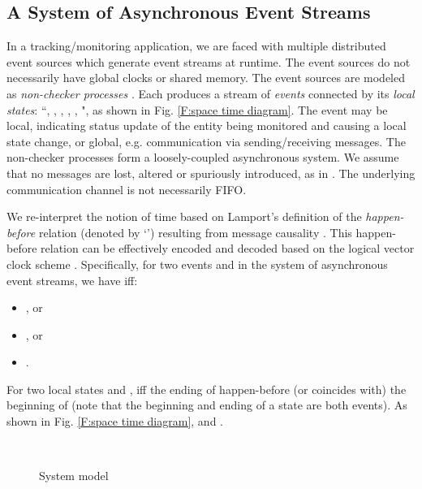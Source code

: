 \documentclass[12pt,journal,letterpaper,compsoc]{IEEEtran}
\begin{document}
\subsection{A System of Asynchronous Event Streams}

In a tracking/monitoring application, we are faced with multiple distributed event sources which generate event streams at runtime. The event sources do not necessarily have global clocks or shared memory. The event sources are modeled as  {\it non-checker processes} . Each  produces a stream of {\it events} connected by its {\it local states}: ``, , , , , ", as shown in Fig. \ref{F:space time diagram}. The event may be local, indicating status update of the entity being monitored and causing a local state change, or global, e.g. communication via sending/receiving messages. The non-checker processes form a loosely-coupled asynchronous system. We assume that no messages are lost, altered or spuriously introduced, as in \cite{Garg94, Garg96}. The underlying communication channel is not necessarily FIFO.

We re-interpret the notion of time based on Lamport's definition of the {\it happen-before} relation (denoted by `') resulting from message causality \cite{Lamport78}. This happen-before relation can be effectively encoded and decoded based on the logical vector clock scheme \cite{Mattern89}. Specifically, for two events  and  in the system of asynchronous event streams, we have  iff:

\begin{itemize}
  \item , or
  \item , or
  \item .
\end{itemize}

\noindent For two local states  and ,  iff the ending of  happen-before (or coincides with) the beginning of  (note that the beginning and ending of a state are both events). As shown in Fig. \ref{F:space time diagram},  and .

\begin{figure}[htbp]
    \hspace*{\fill}
    \\
    \centering\parbox[c]{1.6in}{\caption{System model}}
    \label{F:system model}
\end{figure}
\end{document}

